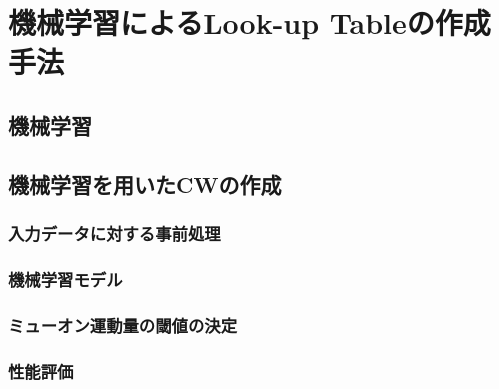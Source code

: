 \chapter{機械学習によるLook-up Tableの作成手法}
\section{機械学習}

\section{機械学習を用いたCWの作成}
\subsection{入力データに対する事前処理}
\subsection{機械学習モデル}
\subsection{ミューオン運動量の閾値の決定}
\subsection{性能評価}